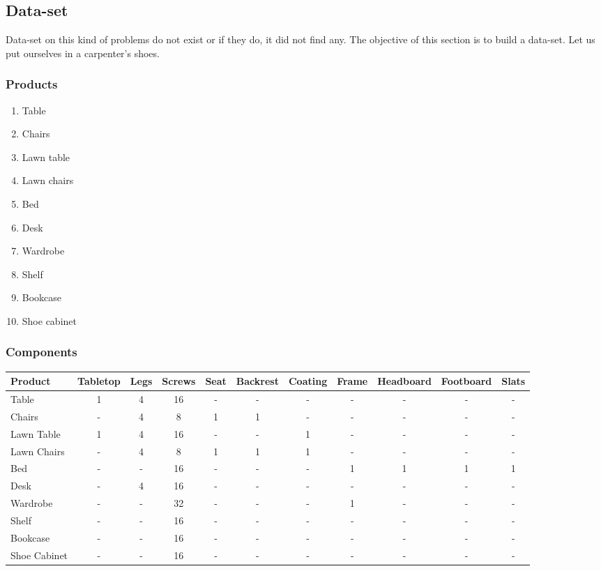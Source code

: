 \documentclass{amsart}
\begin{document}
\subsection{Data-set}
Data-set on this kind of problems do not exist or if they do, it did not find any. The objective of this section is to build a data-set. Let us put ourselves in a carpenter's shoes.
\subsubsection{Products}
\begin{enumerate}
    \item Table
    \item Chairs
    \item Lawn table
    \item Lawn chairs
    \item Bed
    \item Desk
    \item Wardrobe
    \item Shelf
    \item Bookcase
    \item Shoe cabinet
\end{enumerate}
\subsubsection{Components}
\small
\begin{longtable}{| l | c | c | c | c | c | c | c | c | c | c |}
\hline
\textbf{Product} & \textbf{Tabletop} & \textbf{Legs} & \textbf{Screws} & \textbf{Seat} & \textbf{Backrest} & \textbf{Coating} & \textbf{Frame} & \textbf{Headboard} & \textbf{Footboard } & \textbf{Slats } \\ 
\hline
Table & 1 & 4 & 16 & - & - & - & - & - & - & - \\ 
\hline
Chairs & - & 4 & 8 & 1 & 1 & - & - & - & - & - \\ 
\hline
Lawn Table & 1 & 4 & 16 & - & - & 1 & - & - & - & - \\ 
\hline
Lawn Chairs & - & 4 & 8 & 1 & 1 & 1 & - & - & - & - \\ 
\hline
Bed & - & - & 16 & - & - & - & 1 & 1 & 1 & 1 \\ 
\hline
Desk & - & 4 & 16 & - & - & - & - & - & - & - \\ 
\hline
Wardrobe & - & - & 32 & - & - & - & 1 & - & - & - \\ 
\hline
Shelf & - & - & 16 & - & - & - & - & - & - & - \\ 
\hline
Bookcase & - & - & 16 & - & - & - & - & - & - & - \\ 
\hline
Shoe Cabinet & - & - & 16 & - & - & - & - & - & - & - \\ 
\hline
\end{longtable}
\end{document}
